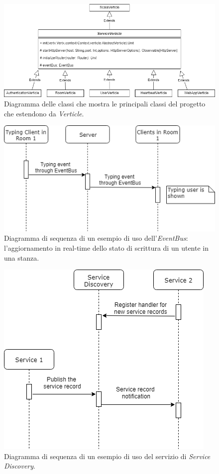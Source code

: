 \begin{figure}
        \includegraphics[scale=0.5, center]{images/VerticleClassDiagram.png}
        \caption{Diagramma delle classi che mostra le principali classi del progetto che estendono da \textit{Verticle}.}
        \label{fig:VerticleClassDiagram}
\end{figure}
\begin{figure}
        \includegraphics[scale=0.5, center]{images/EventBusSequenceDiagram.png}
        \caption{Diagramma di sequenza di un esempio di uso dell'\textit{EventBus}: l'aggiornamento in real-time dello stato di scrittura di un
        utente in una stanza.}
        \label{fig:EventBusSequenceDiagram}
\end{figure}
\begin{figure}
        \includegraphics[scale=0.5, center]{images/ServiceDiscoverySequenceDiagram.png}
        \caption{Diagramma di sequenza di un esempio di uso del servizio di \textit{Service Discovery}.}
        \label{fig:ServiceDiscoverySequenceDiagram}
\end{figure}

